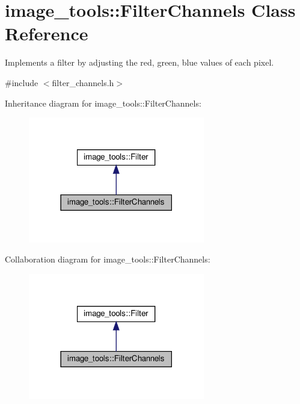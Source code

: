 \hypertarget{classimage__tools_1_1FilterChannels}{}\section{image\+\_\+tools\+:\+:Filter\+Channels Class Reference}
\label{classimage__tools_1_1FilterChannels}


Implements a filter by adjusting the red, green, blue values of each pixel.  




{\ttfamily \#include $<$filter\+\_\+channels.\+h$>$}



Inheritance diagram for image\+\_\+tools\+:\+:Filter\+Channels\+:
\nopagebreak
\begin{figure}[H]
\begin{center}
\leavevmode
\includegraphics[width=218pt]{classimage__tools_1_1FilterChannels__inherit__graph}
\end{center}
\end{figure}


Collaboration diagram for image\+\_\+tools\+:\+:Filter\+Channels\+:
\nopagebreak
\begin{figure}[H]
\begin{center}
\leavevmode
\includegraphics[width=218pt]{classimage__tools_1_1FilterChannels__coll__graph}
\end{center}
\end{figure}
